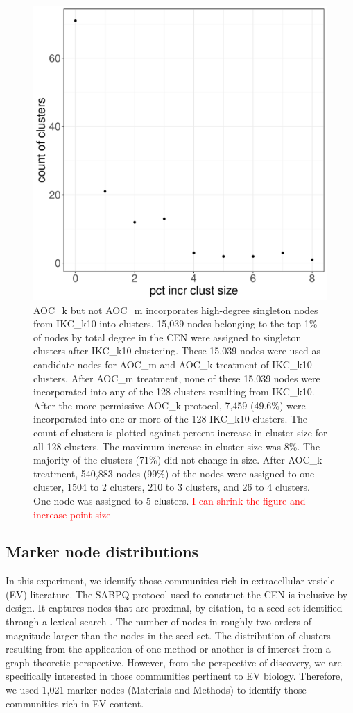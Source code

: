 \documentclass[12pt, oneside]{article}   	%
\begin{document}
\begin{figure}[H]
	\centering
	 \includegraphics[width=0.7\linewidth]{singletons.pdf} 
\captionsetup{width=0.9\textwidth}
\caption{AOC\_k but not AOC\_m incorporates high-degree singleton nodes from IKC\_k10 into clusters. 15,039 nodes belonging to the top  1\% of nodes by total degree in the CEN were assigned to singleton clusters after IKC\_k10 clustering. 
These 15,039  nodes were used as candidate nodes for AOC\_m and AOC\_k treatment of IKC\_k10 clusters. After AOC\_m treatment, none of these 15,039 nodes were incorporated into any of the 128 clusters resulting from  IKC\_k10. After the more permissive AOC\_k protocol, 7,459 (49.6\%) were incorporated into one or more of the 128 IKC\_k10 clusters. The count of clusters is plotted against percent increase in cluster size for all 128 clusters. The maximum increase in cluster size was 8\%. The majority of the clusters (71\%) did not change in size. After AOC\_k treatment, 540,883 nodes (99\%) of the nodes were assigned to one cluster, 1504 to 2 clusters, 210 to 3 clusters, and 26 to 4 clusters. One node was assigned to 5 clusters. \textcolor{red}{I can shrink the figure and increase point size}}
\label{fig:singleton}
\end{figure}

\subsection{Marker node distributions}

In this experiment, we identify those communities rich in extracellular vesicle (EV) literature. The SABPQ protocol  \citep{Wedell2022} used to construct the CEN is inclusive by design. It captures nodes that are proximal, by citation, to a seed set identified through a lexical search \citep{Wedell2022}. The number of nodes in roughly two orders of magnitude larger than the nodes in the seed set. The distribution of clusters resulting from the application of one method or another is of interest from a graph theoretic perspective. However, from the perspective of discovery, we are specifically interested in those communities pertinent to EV biology. Therefore, we used 1,021 marker nodes (Materials and Methods) to identify those communities rich in EV content. 
\end{document}
